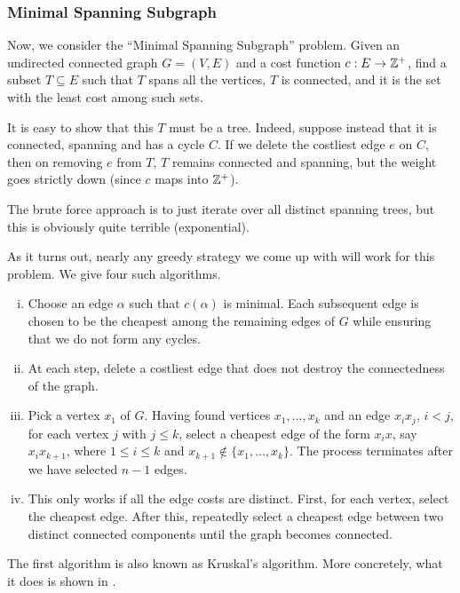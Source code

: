 \subsubsection{Minimal Spanning Subgraph}

Now, we consider the ``Minimal Spanning Subgraph'' problem. Given an undirected connected graph $G=(V,E)$ and a cost function $c:E\to\mathbb{Z}^+$, find a subset $T\subseteq E$ such that $T$ spans all the vertices, $T$ is connected, and it is the set with the least cost among such sets.

It is easy to show that this $T$ must be a tree. Indeed, suppose instead that it is connected, spanning and has a cycle $C$. If we delete the costliest edge $e$ on $C$, then on removing $e$ from $T$, $T$ remains connected and spanning, but the weight goes strictly down (since $c$ maps into $\mathbb{Z}^+$).

The brute force approach is to just iterate over all distinct spanning trees, but this is obviously quite terrible (exponential).

As it turns out, nearly any greedy strategy we come up with will work for this problem. We give four such algorithms.
\begin{enumerate}[(i)]
	\item Choose an edge $\alpha$ such that $c(\alpha)$ is minimal. Each subsequent edge is chosen to be the cheapest among the remaining edges of $G$ while ensuring that we do not form any cycles.
	
	\item At each step, delete a costliest edge that does not destroy the connectedness of the graph.
	
	\item Pick a vertex $x_1$ of $G$. Having found vertices $x_1,\ldots,x_k$ and an edge $x_ix_j$, $i<j$, for each vertex $j$ with $j\leq k$, select a cheapest edge of the form $x_ix$, say $x_i x_{k+1}$, where $1\leq i\leq k$ and $x_{k+1}\not\in\{x_1,\ldots,x_k\}$. The process terminates after we have selected $n-1$ edges.
	
	\item This only works if all the edge costs are distinct. First, for each vertex, select the cheapest edge. After this, repeatedly select a cheapest edge between two distinct connected components until the graph becomes connected.
\end{enumerate}

The first algorithm is also known as Kruskal's algorithm. More concretely, what it does is shown in .

